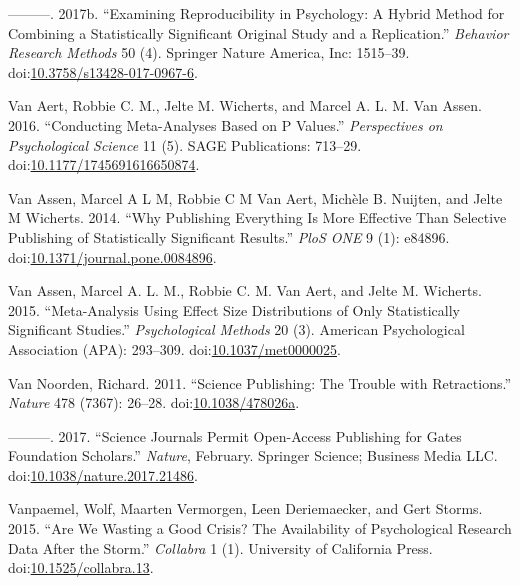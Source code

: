 \documentclass[a5paper]{book}
\begin{document}
\hypertarget{ref-doi:10.3758ux2fs13428-017-0967-6}{}
---------. 2017b. ``Examining Reproducibility in Psychology: A Hybrid
Method for Combining a Statistically Significant Original Study and a
Replication.'' \emph{Behavior Research Methods} 50 (4). Springer Nature
America, Inc: 1515--39.
doi:\href{https://doi.org/10.3758/s13428-017-0967-6}{10.3758/s13428-017-0967-6}.

\hypertarget{ref-doi:10.1177ux2f1745691616650874}{}
Van Aert, Robbie C. M., Jelte M. Wicherts, and Marcel A. L. M. Van
Assen. 2016. ``Conducting Meta-Analyses Based on P Values.''
\emph{Perspectives on Psychological Science} 11 (5). SAGE Publications:
713--29.
doi:\href{https://doi.org/10.1177/1745691616650874}{10.1177/1745691616650874}.

\hypertarget{ref-doi:10.1371ux2fjournal.pone.0084896}{}
Van Assen, Marcel A L M, Robbie C M Van Aert, Michèle B. Nuijten, and
Jelte M Wicherts. 2014. ``Why Publishing Everything Is More Effective
Than Selective Publishing of Statistically Significant Results.''
\emph{PloS ONE} 9 (1): e84896.
doi:\href{https://doi.org/10.1371/journal.pone.0084896}{10.1371/journal.pone.0084896}.

\hypertarget{ref-doi:10.1037ux2fmet0000025}{}
Van Assen, Marcel A. L. M., Robbie C. M. Van Aert, and Jelte M.
Wicherts. 2015. ``Meta-Analysis Using Effect Size Distributions of Only
Statistically Significant Studies.'' \emph{Psychological Methods} 20
(3). American Psychological Association (APA): 293--309.
doi:\href{https://doi.org/10.1037/met0000025}{10.1037/met0000025}.

\hypertarget{ref-doi:10.1038ux2f478026a}{}
Van Noorden, Richard. 2011. ``Science Publishing: The Trouble with
Retractions.'' \emph{Nature} 478 (7367): 26--28.
doi:\href{https://doi.org/10.1038/478026a}{10.1038/478026a}.

\hypertarget{ref-doi:10.1038ux2fnature.2017.21486}{}
---------. 2017. ``Science Journals Permit Open-Access Publishing for
Gates Foundation Scholars.'' \emph{Nature}, February. Springer Science;
Business Media LLC.
doi:\href{https://doi.org/10.1038/nature.2017.21486}{10.1038/nature.2017.21486}.

\hypertarget{ref-doi:10.1525ux2fcollabra.13}{}
Vanpaemel, Wolf, Maarten Vermorgen, Leen Deriemaecker, and Gert Storms.
2015. ``Are We Wasting a Good Crisis? The Availability of Psychological
Research Data After the Storm.'' \emph{Collabra} 1 (1). University of
California Press.
doi:\href{https://doi.org/10.1525/collabra.13}{10.1525/collabra.13}.
\end{document}

